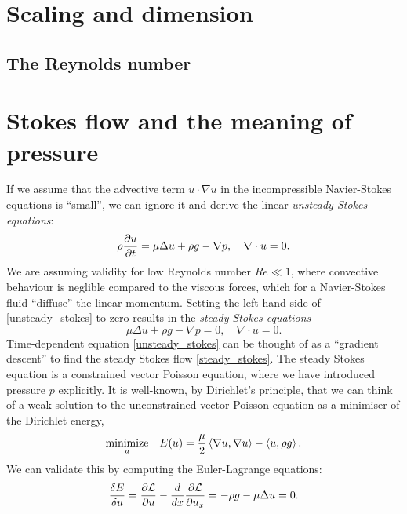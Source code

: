 \section{Scaling and dimension}
\subsection{The Reynolds number}

\section{Stokes flow and the meaning of pressure}\label{pressure_derivation}
If we assume that the advective term $u\cdot \nabla u$ in the incompressible Navier-Stokes equations is ``small'',
we can ignore it and derive the linear \textit{unsteady Stokes equations}:
\begin{equation}\label{unsteady_stokes}
    \rho\frac{\partial u}{\partial t} = \mu\Delta u + \rho g - \nabla p, \quad \nabla\cdot u = 0.
\end{equation}
We are assuming validity for low Reynolds number $Re \ll 1$, where convective behaviour is neglible compared to the viscous forces, which for a
Navier-Stokes fluid ``diffuse'' the linear momentum. Setting the left-hand-side of \eqref{unsteady_stokes} to zero results in the \textit{steady Stokes equations}
\begin{equation}\label{steady_stokes}
    \mu\Delta u + \rho g - \nabla p = 0,\quad \nabla\cdot u = 0.
\end{equation}
Time-dependent equation \eqref{unsteady_stokes} can be thought of as a ``gradient descent'' to find the steady Stokes flow \eqref{steady_stokes}.
The steady Stokes equation is a constrained vector Poisson equation, where we have introduced pressure $p$ explicitly.
It is well-known, by Dirichlet's principle, that we can think
of a weak solution to the unconstrained vector Poisson equation as a minimiser of the Dirichlet energy,
\begin{equation}
\begin{aligned}
& \underset{u}{\text{minimize}}
& & E(u) =  \frac{\mu}{2} \left<\nabla u, \nabla u\right> - \left<u, \rho g\right>.\\
\end{aligned}
\end{equation}
\newcommand{\energygradient}{\frac{\delta E}{\delta u}}
We can validate this by computing the Euler-Lagrange equations:
\begin{align*}
    \frac{\delta E}{\delta u} = \frac{\partial \mathcal{L}}{\partial u} - \frac{d}{dx}\frac{\partial \mathcal{L}}{\partial u_x}
                              = -\rho g - \mu\Delta u = 0.
\end{align*}
